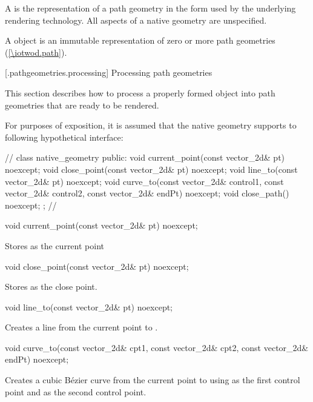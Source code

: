 \pnum
A  is the representation of a path geometry in the form used by the underlying rendering technology. All aspects of a native geometry are unspecified.

\pnum
A  object is an immutable representation of zero or more path geometries (\ref{\iotwod.path}).

 [\iotwod.pathgeometries.processing] {Processing path geometries}

\pnum
This section describes how to process a properly formed  object into path geometries that are ready to be rendered.

\pnum
For purposes of exposition, it is assumed that the native geometry supports to following hypothetical interface:

\begin{codeblock}
// \expos
class native_geometry {
public:
  void current_point(const vector_2d& pt) noexcept;
  void close_point(const vector_2d& pt) noexcept;
  void line_to(const vector_2d& pt) noexcept;
  void curve_to(const vector_2d& control1, const vector_2d& control2,
    const vector_2d& endPt) noexcept;
  void close_path() noexcept;
};
// \expos
\end{codeblock}

\begin{itemdecl}
  void current_point(const vector_2d& pt) noexcept;
\end{itemdecl}
\begin{itemdescr}
	\pnum
	\effects
	Stores  as the current point

\end{itemdescr}

\begin{itemdecl}
  void close_point(const vector_2d& pt) noexcept;
\end{itemdecl}
\begin{itemdescr}
	\pnum
	\effects
	Stores  as the close point.

\end{itemdescr}

\begin{itemdecl}
  void line_to(const vector_2d& pt) noexcept;
\end{itemdecl}
\begin{itemdescr}
	\pnum
	\effects
	Creates a line from the current point to .

\end{itemdescr}

\begin{itemdecl}
  void curve_to(const vector_2d& cpt1, const vector_2d& cpt2,
    const vector_2d& endPt) noexcept;
\end{itemdecl}
\begin{itemdescr}
	\pnum
	\effects
	Creates a cubic B\'ezier curve from the current point to  using  as the first control point and  as the second control point.

\end{itemdescr}

